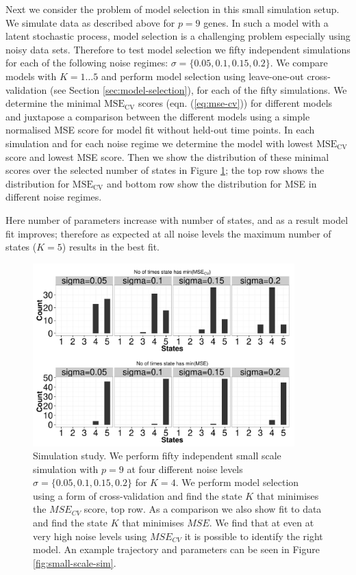 Next we consider the problem of model selection in this small simulation setup. We simulate data as described above for $p=9$ genes. In such a model with a latent stochastic process, model selection is a challenging problem especially using noisy data sets. Therefore to test model selection we fifty independent simulations for each of the following noise regimes: $\sigma = \lbrace 0.05, 0.1, 0.15, 0.2 \rbrace $. We compare models with $K = 1 \ldots 5$ and perform model selection using leave-one-out cross-validation (see Section \ref{sec:model-selection}), for each of the fifty simulations. We determine the minimal $\mathrm{MSE_{CV}}$ scores (eqn. (\ref{eq:mse-cv})) for different models and juxtapose a comparison between the different models using a simple normalised MSE score for model fit without held-out time points. In each simulation and for each noise regime we determine the model with lowest $\mathrm{MSE_{CV}}$ score and lowest MSE score. Then we show the distribution of these minimal scores over the selected number of states in Figure \ref{fig:small-scale-modelSlct}; the top row shows the distribution for $\mathrm{MSE_{CV}}$ and bottom row show the distribution for MSE in different noise regimes. 

Here number of parameters increase with number of states, and as a result model fit improves; therefore as expected at all noise levels the maximum number of states ($K=5$) results in the best fit. 

\begin{figure}
  \centering
  \includegraphics[width=0.9\textwidth]{pics/hist-all.pdf}
  \caption{Simulation study. We perform fifty independent small scale simulation with $p=9$ at four different noise levels $\sigma = \lbrace 0.05, 0.1, 0.15, 0.2\rbrace$ for $K=4$. We perform model selection using a form of cross-validation and find the state $K$ that minimises the $MSE_{CV}$ score, top row. As a comparison we also show fit to data and find the state $K$ that minimises $MSE$. We find that at even at very high noise levels using $MSE_{CV}$ it is possible to identify the right model. An example trajectory and parameters can be seen in Figure \ref{fig:small-scale-sim}.}
  \label{fig:small-scale-modelSlct}
\end{figure}

